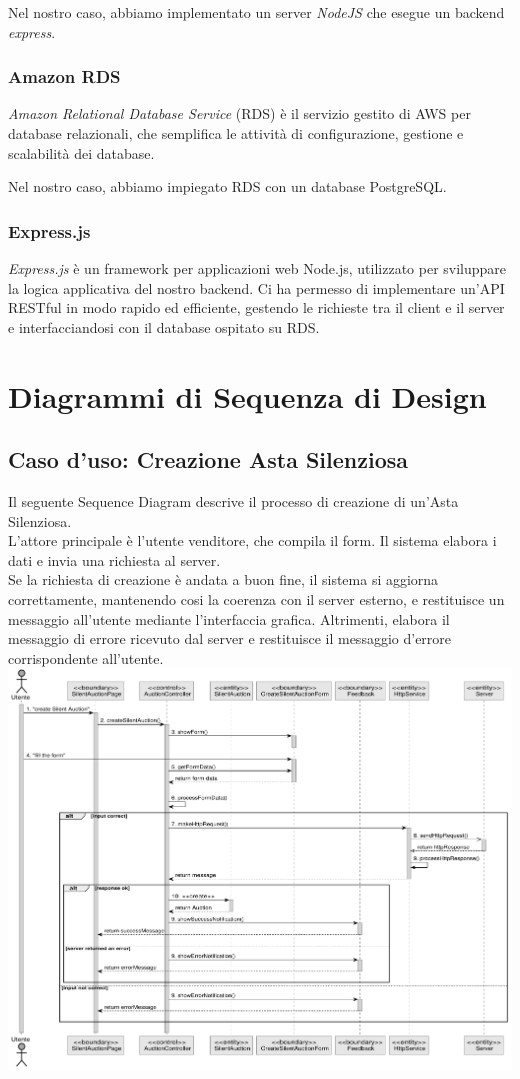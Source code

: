 Nel nostro caso, abbiamo implementato un server \textit{NodeJS} che esegue un backend \textit{express}.

\subsubsection{Amazon RDS}
\textit{Amazon Relational Database Service} (RDS) è il servizio gestito di AWS per database relazionali, che semplifica le attività di configurazione, gestione e scalabilità dei database.

Nel nostro caso, abbiamo impiegato RDS con un database PostgreSQL.

\subsubsection{Express.js}
\textit{Express.js} è un framework per applicazioni web Node.js, utilizzato per sviluppare la logica applicativa del nostro backend. Ci ha permesso di implementare un'API RESTful in modo rapido ed efficiente, gestendo le richieste tra il client e il server e interfacciandosi con il database ospitato su RDS.

\pagebreak
\section{Diagrammi di Sequenza di Design}
\subsection{Caso d'uso: Creazione Asta Silenziosa}
Il seguente Sequence Diagram descrive il processo di creazione di un'Asta Silenziosa. \\
L'attore principale è l'utente venditore, che compila il form. Il sistema elabora i dati e invia una richiesta al server. \\
Se la richiesta di creazione è andata a buon fine, il sistema si aggiorna correttamente, mantenendo cosi la coerenza con il server esterno, e restituisce un messaggio all'utente mediante l'interfaccia grafica.
Altrimenti, elabora il messaggio di errore ricevuto dal server e restituisce il messaggio d'errore corrispondente all'utente. \bskip
\includegraphics[width=\textwidth]{assets/sequence/creazione_asta_silenziosa.pdf}


